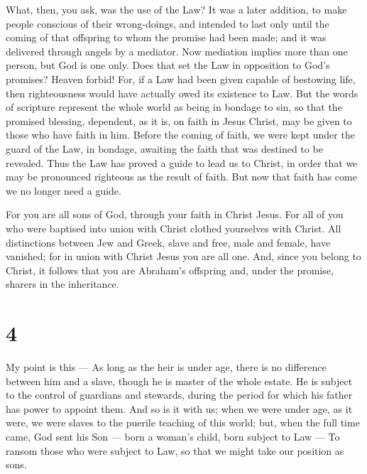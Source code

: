  What, then, you ask, was the use of the Law? It was a
later addition, to make people conscious of their wrong-doings, and
intended to last only until the coming of that offspring to whom the
promise had been made; and it was delivered through angels by a
mediator.  Now mediation implies more than one person, but
God is one only.  Does that set the Law in opposition to
God's promises? Heaven forbid! For, if a Law had been given capable of
bestowing life, then righteousness would have actually owed its
existence to Law.  But the words of scripture represent the
whole world as being in bondage to sin, so that the promised blessing,
dependent, as it is, on faith in Jesus Christ, may be given to those who
have faith in him.  Before the coming of faith, we were
kept under the guard of the Law, in bondage, awaiting the faith that was
destined to be revealed.  Thus the Law has proved a guide
to lead us to Christ, in order that we may be pronounced righteous as
the result of faith.  But now that faith has come we no
longer need a guide.

 For you are all sons of God, through your faith in Christ
Jesus.  For all of you who were baptised into union with
Christ clothed yourselves with Christ.  All distinctions
between Jew and Greek, slave and free, male and female, have vanished;
for in union with Christ Jesus you are all one.  And, since
you belong to Christ, it follows that you are Abraham's offspring and,
under the promise, sharers in the inheritance.

\hypertarget{section-3}{%
\section{4}\label{section-3}}

 My point is this --- As long as the heir is under age,
there is no difference between him and a slave, though he is master of
the whole estate.  He is subject to the control of guardians
and stewards, during the period for which his father has power to
appoint them.  And so is it with us; when we were under age,
as it were, we were slaves to the puerile teaching of this world;
 but, when the full time came, God sent his Son --- born a
woman's child, born subject to Law ---  To ransom those who
were subject to Law, so that we might take our position as sons.


